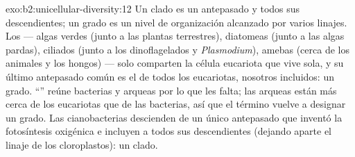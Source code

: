 \begin{solution}{exo:b2:unicellular-diversity:12}
Un clado es un antepasado y todos sus descendientes; un grado es un
nivel de organización alcanzado por varios linajes. Los  ---
algas verdes (junto a las plantas terrestres), diatomeas (junto a las
algas pardas), ciliados (junto a los dinoflagelados y \emph{Plasmodium}),
amebas (cerca de los animales y los hongos) --- solo comparten la célula
eucariota que vive sola, y su último antepasado común es el de todos los
eucariotas, nosotros incluidos: un grado. ``'' reúne bacterias
y arqueas por lo que les falta; las arqueas están más cerca de los
eucariotas que de las bacterias, así que el término vuelve a designar un
grado. Las cianobacterias descienden de un único antepasado que inventó
la fotosíntesis oxigénica e incluyen a todos sus descendientes (dejando
aparte el linaje de los cloroplastos): un clado.
\end{solution}

